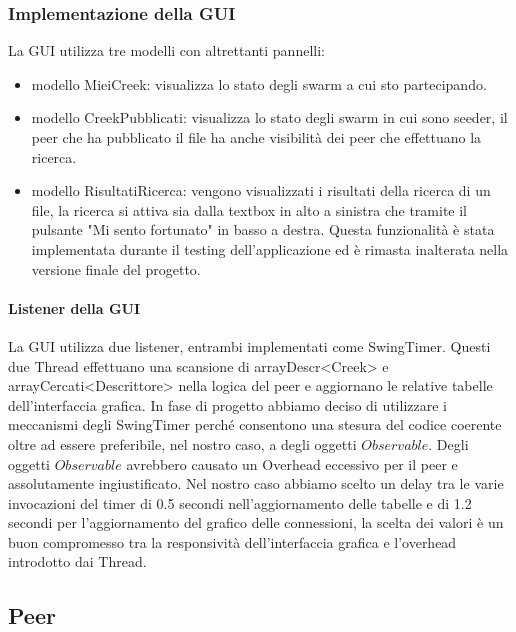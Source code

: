 \subsubsection{Implementazione della GUI}

La GUI utilizza tre modelli con altrettanti pannelli:
\begin{itemize}
\item modello MieiCreek: visualizza lo stato degli swarm a cui sto partecipando.
\item modello CreekPubblicati: visualizza lo stato degli swarm in cui sono seeder, il peer che ha pubblicato il file ha anche visibilit\`a dei peer che effettuano la ricerca.
\item modello RisultatiRicerca: vengono visualizzati i risultati della ricerca di un file, la ricerca si attiva sia dalla textbox in alto a sinistra che tramite il pulsante "Mi sento fortunato" in basso a destra. Questa funzionalit\`a \`e stata implementata durante il testing dell'applicazione ed \`e rimasta inalterata nella versione finale del progetto.
\end{itemize}

\paragraph{Listener della GUI}
La GUI utilizza due listener, entrambi implementati come SwingTimer. Questi due Thread effettuano una scansione di arrayDescr<Creek> e arrayCercati<Descrittore> nella logica del peer e aggiornano le relative tabelle dell'interfaccia grafica.
In fase di progetto abbiamo deciso di utilizzare i meccanismi degli SwingTimer perch\'e consentono una stesura del codice coerente oltre ad essere preferibile, nel nostro caso, a degli oggetti $Observable$. Degli oggetti $Observable$ avrebbero causato un Overhead eccessivo per il peer e assolutamente ingiustificato. Nel nostro caso abbiamo scelto un delay tra le varie invocazioni del timer di 0.5 secondi nell'aggiornamento delle tabelle e di 1.2 secondi per l'aggiornamento del grafico delle connessioni, la scelta dei valori \`e un buon compromesso tra la responsivit\`a dell'interfaccia grafica e l'overhead introdotto dai Thread.

\subsection{Peer}

